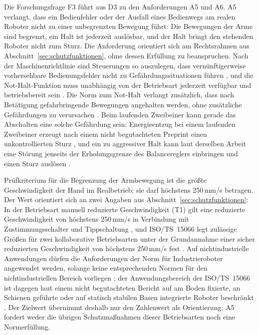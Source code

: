 Die Forschungsfrage F3 führt aus D3 zu den Anforderungen A5 und A6.
A5 verlangt, dass ein Bedienfehler oder der Ausfall eines Bedienwegs am realen Roboter nicht zu einer unbegrenzten Bewegung führt: Die Bewegungen der Arme sind begrenzt, ein Halt ist jederzeit auslösbar, und der Halt bringt den stehenden Roboter nicht zum Sturz.
Die Anforderung orientiert sich am Rechtsrahmen aus Abschnitt~\ref{sec:schutzfunktionen}, ohne dessen Erfüllung zu beanspruchen.
Nach der Maschinenrichtlinie sind Steuerungen so auszulegen, dass vernünftigerweise vorhersehbare Bedienungsfehler nicht zu Gefährdungssituationen führen \cite{MRL2006}, und die Not-Halt-Funktion muss unabhängig von der Betriebsart jederzeit verfügbar und betriebsbereit sein \cite{MRL2006}.
Die Norm zum Not-Halt verlangt zusätzlich, dass nach Betätigung gefahrbringende Bewegungen angehalten werden, ohne zusätzliche Gefährdungen zu verursachen \cite{DINENISO13850}.
Beim laufenden Zweibeiner kann gerade das Abschalten eine solche Gefährdung sein: Energieentzug bei einem laufenden Zweibeiner erzeugt nach einem nicht begutachteten Preprint einen unkontrollierten Sturz \cite{Ding2026}, und ein zu aggressiver Halt kann laut derselben Arbeit eine Störung jenseits der Erholungsgrenze des Balancereglers einbringen und einen Sturz auslösen \cite{Ding2026}.

Prüfkriterium für die Begrenzung der Armbewegung ist die größte Geschwindigkeit der Hand im Realbetrieb; sie darf höchstens 250\,mm/s betragen. %
Der Wert orientiert sich an zwei Angaben aus Abschnitt~\ref{sec:schutzfunktionen}: In der Betriebsart manuell reduzierte Geschwindigkeit (T1) gilt eine reduzierte Geschwindigkeit von höchstens 250\,mm/s in Verbindung mit Zustimmungsschalter und Tippschaltung \cite{DGUV2015}, und ISO/TS~15066 legt zulässige Größen für zwei kollaborative Betriebsarten unter der Grundannahme einer sicher reduzierten Geschwindigkeit von höchstens 250\,mm/s fest \cite{Villani2018}.
Auf nichtindustrielle Anwendungen dürfen die Anforderungen der Norm für Industrieroboter angewendet werden, solange keine entsprechenden Normen für den nichtindustriellen Bereich vorliegen \cite{DGUV2015}; der Anwendungsbereich der ISO/TS~15066 ist dagegen laut einem nicht begutachteten Bericht auf am Boden fixierte, an Schienen geführte oder auf statisch stabilen Basen integrierte Roboter beschränkt \cite{Prather2025}.
Der Zielwert übernimmt deshalb nur den Zahlenwert als Orientierung; A5 fordert weder die übrigen Schutzmaßnahmen dieser Betriebsarten noch eine Normerfüllung.

